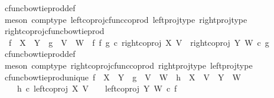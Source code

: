\begin{isabellebody}
\ cfunc{\isacharunderscore}{\kern0pt}bowtie{\isacharunderscore}{\kern0pt}prod{\isacharunderscore}{\kern0pt}def{}\isanewline
\ \ \isamarkupfalse%
\ {\isacharparenleft}{\kern0pt}meson\ comp{\isacharunderscore}{\kern0pt}type\ left{\isacharunderscore}{\kern0pt}coproj{\isacharunderscore}{\kern0pt}cfunc{\isacharunderscore}{\kern0pt}coprod\ left{\isacharunderscore}{\kern0pt}proj{\isacharunderscore}{\kern0pt}type\ right{\isacharunderscore}{\kern0pt}proj{\isacharunderscore}{\kern0pt}type{\isacharparenright}{\kern0pt}%
\endisatagproof
{\isafoldproof}%
%
\isadelimproof
\isanewline
%
\endisadelimproof
\isanewline
\ \isamarkupfalse%
\ right{\isacharunderscore}{\kern0pt}coproj{\isacharunderscore}{\kern0pt}cfunc{\isacharunderscore}{\kern0pt}bowtie{\isacharunderscore}{\kern0pt}prod{\isacharcolon}{\kern0pt}\isanewline
\ \ {\isachardoublequoteopen}f\ {\isacharcolon}{\kern0pt}\ X\ {\isasymrightarrow}\ Y\ {\isasymLongrightarrow}\ g\ {\isacharcolon}{\kern0pt}\ V\ {\isasymrightarrow}\ W\ {\isasymLongrightarrow}\ {\isacharparenleft}{\kern0pt}f\ {\isasymbowtie}\isactrlsub f\ g{\isacharparenright}{\kern0pt}\ {\isasymcirc}\isactrlsub c\ right{\isacharunderscore}{\kern0pt}coproj\ X\ V\ {\isacharequal}{\kern0pt}\ right{\isacharunderscore}{\kern0pt}coproj\ Y\ W\ {\isasymcirc}\isactrlsub c\ g{\isachardoublequoteclose}\isanewline
%
\isadelimproof
\ \ %
\endisadelimproof
%
\isatagproof
{}\isamarkupfalse%
\ cfunc{\isacharunderscore}{\kern0pt}bowtie{\isacharunderscore}{\kern0pt}prod{\isacharunderscore}{\kern0pt}def{}\isanewline
\ \ \isamarkupfalse%
\ {\isacharparenleft}{\kern0pt}meson\ comp{\isacharunderscore}{\kern0pt}type\ right{\isacharunderscore}{\kern0pt}coproj{\isacharunderscore}{\kern0pt}cfunc{\isacharunderscore}{\kern0pt}coprod\ right{\isacharunderscore}{\kern0pt}proj{\isacharunderscore}{\kern0pt}type\ left{\isacharunderscore}{\kern0pt}proj{\isacharunderscore}{\kern0pt}type{\isacharparenright}{\kern0pt}%
\endisatagproof
{\isafoldproof}%
%
\isadelimproof
\isanewline
%
\endisadelimproof
\isanewline
{}\isamarkupfalse%
\ cfunc{\isacharunderscore}{\kern0pt}bowtie{\isacharunderscore}{\kern0pt}prod{\isacharunderscore}{\kern0pt}unique{\isacharcolon}{\kern0pt}\ {\isachardoublequoteopen}f\ {\isacharcolon}{\kern0pt}\ X\ {\isasymrightarrow}\ Y\ {\isasymLongrightarrow}\ g\ {\isacharcolon}{\kern0pt}\ V\ {\isasymrightarrow}\ W\ {\isasymLongrightarrow}\ h\ {\isacharcolon}{\kern0pt}\ X\ {\isasymCoprod}\ V\ {\isasymrightarrow}\ Y\ {\isasymCoprod}\ W\ {\isasymLongrightarrow}\isanewline
\ \ \ \ h\ {\isasymcirc}\isactrlsub c\ left{\isacharunderscore}{\kern0pt}coproj\ X\ V\ \ \ {\isacharequal}{\kern0pt}\ left{\isacharunderscore}{\kern0pt}coproj\ Y\ W\ {\isasymcirc}\isactrlsub c\ f\ {\isasymLongrightarrow}\isanewline

\end{isabellebody}
